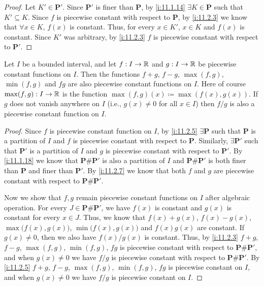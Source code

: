 \begin{proof}
  Let \(K' \in \mathbf{P}'\).
  Since \(\mathbf{P}'\) is finer than \(\mathbf{P}\), by \cref{i:11.1.14} \(\exists K \in \mathbf{P}\) such that \(K' \subseteq K\).
  Since \(f\) is piecewise constant with respect to \(\mathbf{P}\), by \cref{i:11.2.3} we know that \(\forall x \in K\), \(f(x)\) is constant.
  Thus, for every \(x \in K'\), \(x \in K\) and \(f(x)\) is constant.
  Since \(K'\) was arbitrary, by \cref{i:11.2.3} \(f\) is piecewise constant with respect to \(\mathbf{P}'\).
\end{proof}

\begin{lem}\label{i:11.2.8}
  Let \(I\) be a bounded interval, and let \(f : I \to \mathbb{R}\) and \(g : I \to \mathbb{R}\) be piecewise constant functions on \(I\).
  Then the functions \(f + g\), \(f - g\), \(\max(f, g)\), \(\min(f, g)\) and \(fg\) are also piecewise constant functions on \(I\).
  Here of course \(\max(f, g) : I \to \mathbb{R}\) is the function \(\max(f, g)(x) \coloneqq \max(f(x), g(x))\).
  If \(g\) does not vanish anywhere on \(I\) (i.e., \(g(x) \neq 0\) for all \(x \in I\)) then \(f / g\) is also a piecewise constant function on \(I\).
\end{lem}

\begin{proof}
  Since \(f\) is piecewise constant function on \(I\), by \cref{i:11.2.5} \(\exists \mathbf{P}\) such that \(\mathbf{P}\) is a partition of \(I\) and \(f\) is piecewise constant with respect to \(\mathbf{P}\).
  Similarly, \(\exists \mathbf{P}'\) such that \(\mathbf{P}'\) is a partition of \(I\) and \(g\) is piecewise constant with respect to \(\mathbf{P}'\).
  By \cref{i:11.1.18} we know that \(\mathbf{P} \# \mathbf{P}'\) is also a partition of \(I\) and \(\mathbf{P} \# \mathbf{P}'\) is both finer than \(\mathbf{P}\) and finer than \(\mathbf{P}'\).
  By \cref{i:11.2.7} we know that both \(f\) and \(g\) are piecewise constant with respect to \(\mathbf{P} \# \mathbf{P}'\).

  Now we show that \(f, g\) remain piecewise constant functions on \(I\) after algebraic operation.
  For every \(J \in \mathbf{P} \# \mathbf{P}'\), we have \(f(x)\) is constant and \(g(x)\) is constant for every \(x \in J\).
  Thus, we know that \(f(x) + g(x)\), \(f(x) - g(x)\), \(\max\big(f(x), g(x)\big)\), \(\min\big(f(x), g(x)\big)\) and \(f(x) g(x)\) are constant.
  If \(g(x) \neq 0\), then we also have \(f(x) / g(x)\) is constant.
  Thus, by \cref{i:11.2.3} \(f + g\), \(f - g\), \(\max(f, g)\), \(\min(f, g)\), \(fg\) is piecewise constant with respect to \(\mathbf{P} \# \mathbf{P}'\), and when \(g(x) \neq 0\) we have \(f / g\) is piecewise constant with respect to \(\mathbf{P} \# \mathbf{P}'\).
  By \cref{i:11.2.5} \(f + g\), \(f - g\), \(\max(f, g)\), \(\min(f, g)\), \(fg\) is piecewise constant on \(I\), and when \(g(x) \neq 0\) we have \(f / g\) is piecewise constant on \(I\).
\end{proof}

